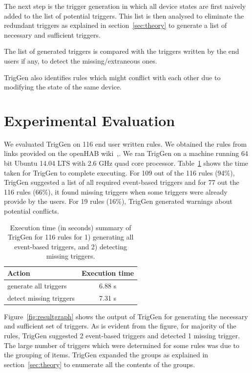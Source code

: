\documentclass{sig-alternate-05-2015}
\begin{document}
The next step is the trigger generation in which all device states are first naively added to the list of potential triggers. This list is then analysed to eliminate the redundant triggers as explained in section~\ref{sec:theory} to generate a list of necessary and sufficient triggers. 

The list of generated triggers is compared with the triggers written by the end users if any, to detect the missing/extraneous ones.

TrigGen also identifies rules which might conflict with each other due to modifying the state of the same device. 

 
\section{Experimental Evaluation}
We evaluated TrigGen on 116 end user written rules. We obtained the rules from links provided on the openHAB wiki~\cite{data1},\cite{data2}. We ran TrigGen on a machine running 64 bit Ubuntu 14.04 LTS with 2.6 GHz quad core processor. Table~\ref{tab:time} shows the time taken for TrigGen to complete executing.
For 109 out of the 116 rules (94\%), TrigGen suggested a list of all required event-based triggers and for 77 out the 116 rules (66\%), it found missing triggers when some triggers were already provide by the users. For 19 rules (16\%), TrigGen generated warnings about potential conflicts. 

\begin{table}[ht]
\centering
\begin{tabular}{|l|c|}
\hline
Action & Execution time\\ \hline
generate all triggers & 6.88 s \\ \hline
detect missing triggers & 7.31 s \\\hline
\end{tabular}
\caption{Execution time  (in seconds) summary of TrigGen for 116 rules for 1) generating all event-based triggers, and 2) detecting missing triggers. }
\label{tab:time}
\end{table}

Figure~\ref{fig:resultgraph} shows the output of TrigGen for generating the necessary and sufficient set of triggers. As is evident from the figure, for majority of the rules, TrigGen suggested 2 event-based triggers and detected 1 missing trigger. The large number of triggers which were determined for some rules was due to the grouping of items. TrigGen expanded the groups as explained in section~\ref{sec:theory} to enumerate all the contents of the groups. 
\end{document}
